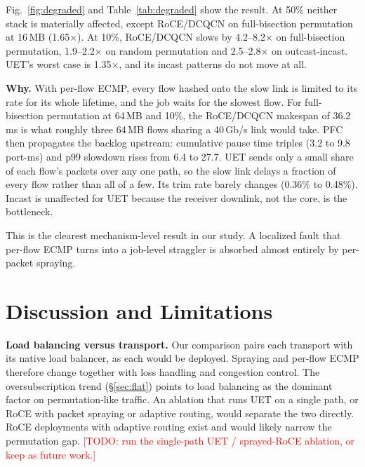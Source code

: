 \documentclass[conference]{IEEEtran}
\newcommand{\todo}[1]{\textcolor{red}{[TODO: #1]}}
\begin{document}
\begin{table}[t]
\centering
\caption{Makespan slowdown from one degraded link (range over 16/64/100\,MB).}
\label{tab:degraded}
\footnotesize
\setlength{\tabcolsep}{3.5pt}

\end{table}

Fig.~\ref{fig:degraded} and Table~\ref{tab:degraded} show the result.
At 50\% neither stack is materially affected, except RoCE/DCQCN on full-bisection
permutation at 16\,MB (1.65$\times$). At 10\%, RoCE/DCQCN slows by
4.2--8.2$\times$ on full-bisection permutation, 1.9--2.2$\times$ on random
permutation and 2.5--2.8$\times$ on outcast-incast. UET's worst case is
1.35$\times$, and its incast patterns do not move at all.

\textbf{Why.}
With per-flow ECMP, every flow hashed onto the slow link is limited to its rate
for its whole lifetime, and the job waits for the slowest flow. For
full-bisection permutation at 64\,MB and 10\%, the RoCE/DCQCN makespan of
36.2\,ms is what roughly three 64\,MB flows sharing a 40\,Gb/s link would take.
PFC then propagates the backlog upstream: cumulative pause time triples (3.2
to 9.8 port-ms) and p99 slowdown rises from 6.4 to 27.7. UET sends only a small share
of each flow's packets over any one path, so the slow link delays a fraction of
every flow rather than all of a few. Its trim rate barely changes (0.36\% to
0.48\%). Incast is unaffected for UET because the receiver downlink, not the
core, is the bottleneck.

This is the clearest mechanism-level result in our study. A localized fault
that per-flow ECMP turns into a job-level straggler is absorbed almost entirely
by per-packet spraying.
\fi

\section{Discussion and Limitations}
\label{sec:discussion}

\textbf{Load balancing versus transport.}
Our comparison pairs each transport with its native load balancer, as each
would be deployed. Spraying and per-flow ECMP therefore change together with
loss handling and congestion control. The oversubscription trend
(\S\ref{sec:flat}) points to load balancing as the dominant factor on
permutation-like traffic.
An
ablation that runs UET on a single path, or RoCE with packet spraying or
adaptive routing, would separate the two directly. RoCE deployments with
adaptive routing exist and would likely narrow the permutation gap.
\todo{run the single-path UET / sprayed-RoCE ablation, or keep as future work.}
\end{document}
